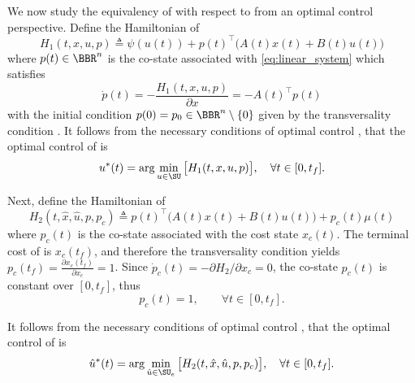 \documentclass[conf]{new-aiaa}
\begin{document}
We now study the equivalency of  with respect to  from an optimal control perspective. Define the Hamiltonian of 
%
\begin{equation*}
    H_1(t,x,u,p) \triangleq \psi(u(t)) + p(t)^\top \big( A(t)x(t)+B(t)u(t)\big)
\end{equation*}
%
where $p(t) \in \BBR^n$ is the co-state associated with \cref{eq:linear_system} which satisfies
%
\begin{equation}
    \dot p(t) = - \frac{H_1(t,x,u,p)}{\partial x} = -A(t)^\top p(t)
\end{equation}
%
with the initial condition $p(0) = p_0 \in \BBR^n \setminus \{0\}$ given by the transversality condition \cite[Theorem 6.3.5]{berkovitz_nonlinear_2013}. It follows from the necessary conditions of optimal control \cite[Theorem 6.7.1]{berkovitz_nonlinear_2013}, that the optimal control of  is 
%
\begin{equation}\label{eq:optimal_control_p1}
    u^*(t) = \arg \min_{u \in \SU} \big[ H_1(t,x,u,p) \big], \quad \forall t \in [0,t_f].
\end{equation}

Next, define the Hamiltonian of 
%
\begin{equation*}
    H_2(t,\hat x,\hat u,p, p_c) \triangleq p(t)^\top \big( A(t)x(t)+B(t)u(t)\big) + p_c(t) \mu(t)
\end{equation*}
%
where $p_c(t)$ is the co-state associated with the cost state $x_c(t)$. The terminal cost of  is $x_c(t_f)$, and therefore the transversality condition yields $p_c(t_f)=\frac{\partial x_c(t_f)}{\partial x_c}=1$. Since $\dot p_c(t) = -\partial H_2/\partial x_c = 0$, the co-state $p_c(t)$ is constant over $[0,t_f]$, thus
%
\begin{equation*}
p_c(t) = 1, \qquad \forall t\in[0,t_f].
\end{equation*}

It follows from the necessary conditions of optimal control \cite[Theorem 6.7.1]{berkovitz_nonlinear_2013}, that the optimal control of  is 
%
\begin{equation}\label{eq:optimal_control_p2}
    \hat u^*(t) = \arg \min_{\hat u \in \SU_e} \big[ H_2(t,\hat x,\hat u,p, p_c) \big], \quad \forall t \in [0,t_f].
\end{equation}

\end{document}
